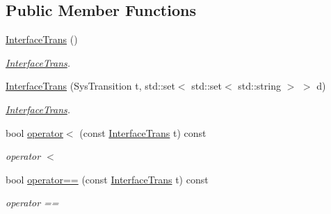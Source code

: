 \subsection*{Public Member Functions}
\begin{DoxyCompactItemize}
\item 
\hyperlink{class_interface_trans_aec48dc89de71ed06963b6d0028f1084e}{Interface\+Trans} ()\hypertarget{class_interface_trans_aec48dc89de71ed06963b6d0028f1084e}{}\label{class_interface_trans_aec48dc89de71ed06963b6d0028f1084e}

\begin{DoxyCompactList}\small\item\em \hyperlink{class_interface_trans}{Interface\+Trans}. \end{DoxyCompactList}\item 
\hyperlink{class_interface_trans_adc6c3d596b350888b1e3ef10d42afd55}{Interface\+Trans} (Sys\+Transition t, std\+::set$<$ std\+::set$<$ std\+::string $>$ $>$ d)
\begin{DoxyCompactList}\small\item\em \hyperlink{class_interface_trans}{Interface\+Trans}. \end{DoxyCompactList}\item 
bool \hyperlink{class_interface_trans_ae1cfa76aa5fe981e5ea4e85501708a9c}{operator$<$} (const \hyperlink{class_interface_trans}{Interface\+Trans} t) const 
\begin{DoxyCompactList}\small\item\em operator $<$ \end{DoxyCompactList}\item 
bool \hyperlink{class_interface_trans_a1dd390b9c49572ad13bc57a1a90529b9}{operator==} (const \hyperlink{class_interface_trans}{Interface\+Trans} t) const 
\begin{DoxyCompactList}\small\item\em operator == \end{DoxyCompactList}\end{DoxyCompactItemize}
